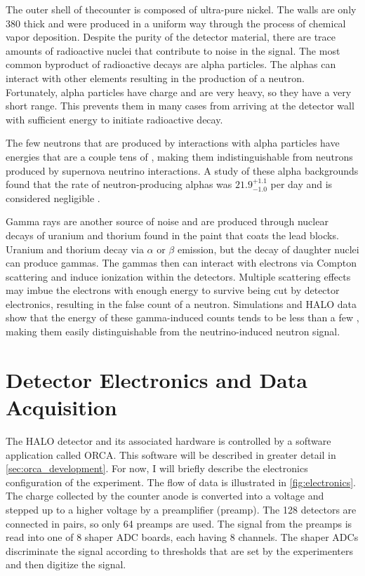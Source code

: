 	The outer shell of the\he counter is composed of ultra-pure nickel. The walls are only \SI{380}{\micron} thick and were produced in a uniform way through the process of chemical vapor deposition. Despite the purity of the detector material, there are trace amounts of radioactive nuclei that contribute to noise in the signal. The most common byproduct of radioactive decays are alpha particles. The alphas can interact with other elements resulting in the production of a neutron. Fortunately, alpha particles have charge and are very heavy, so they have a very short range. This prevents them in many cases from arriving at the detector wall with sufficient energy to initiate radioactive decay. 

	The few neutrons that are produced by interactions with alpha particles have energies that are a couple tens of \eMeV{}, making them indistinguishable from neutrons produced by supernova neutrino interactions. A study of these alpha backgrounds found that the rate of neutron-producing alphas was $21.9^{+1.1}_{-1.0}$ per day and is considered negligible \cite{Shantz2010}. 

	Gamma rays are another source of noise and are produced through nuclear decays of uranium and thorium found in the paint that coats the lead blocks. Uranium and thorium decay via $\alpha$ or $\beta$ emission, but the decay of daughter nuclei can produce gammas. The gammas then can interact with electrons via Compton scattering and induce ionization within the \he detectors. Multiple scattering effects may imbue the electrons with enough energy to survive being cut by detector electronics, resulting in the false count of a neutron. Simulations\cite{Shantz2010} and HALO data show that the energy of these gamma-induced counts tends to be less than a few \eMeV{}, making them easily distinguishable from the neutrino-induced neutron signal.

	\section{Detector Electronics and Data Acquisition}
	\label{sec:electronics}
		The HALO detector and its associated hardware is controlled by a software application called ORCA. This software will be described in greater detail in \SEC \ref{sec:orca_development}. For now, I will briefly describe the electronics configuration of the experiment. The flow of data is illustrated in \FIG \ref{fig:electronics}. The charge collected by the \he counter anode is converted into a voltage and stepped up to a higher voltage by a preamplifier (preamp). The 128 detectors are connected in pairs, so only 64 preamps are used. The signal from the preamps is read into one of 8 shaper ADC boards, each having 8 channels. The shaper ADCs discriminate the signal according to thresholds that are set by the experimenters and then digitize the signal.

